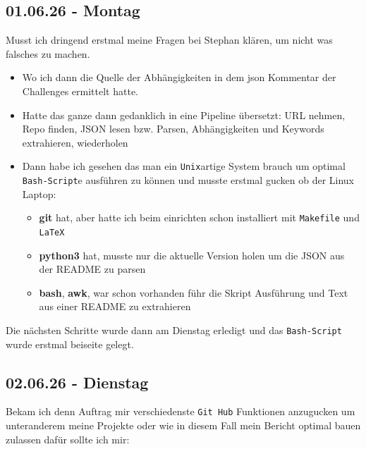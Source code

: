 {\small
\subsection{01.06.26 - Montag}

Musst ich dringend erstmal meine Fragen bei Stephan klären, um nicht was falsches zu machen.

\begin{itemize}
  \item Wo ich dann die Quelle der Abhängigkeiten in dem json Kommentar der Challenges ermittelt hatte.
  \item Hatte das ganze dann gedanklich in eine Pipeline übersetzt:
  URL nehmen, Repo finden, JSON lesen bzw. Parsen, Abhängigkeiten und Keywords extrahieren, wiederholen
  \item Dann habe ich gesehen das man ein \texttt{Unix}artige System brauch um optimal \texttt{Bash-Script}e ausführen zu können und musste erstmal gucken ob der Linux Laptop:
  \begin{itemize}
    \item \textbf{git} hat, aber hatte ich beim einrichten schon installiert mit \texttt{Makefile} und \texttt{LaTeX}
    \item \textbf{python3} hat, musste nur die aktuelle Version holen um die JSON aus der README zu parsen
    \item \textbf{bash}, \textbf{awk}, war schon vorhanden führ die Skript Ausführung und Text aus einer README zu extrahieren
  \end{itemize}
\end{itemize}

Die nächsten Schritte wurde dann am Dienstag erledigt und das \texttt{Bash-Script} wurde erstmal beiseite gelegt.

\subsection{02.06.26 - Dienstag}


Bekam ich denn Auftrag mir verschiedenste \texttt{Git Hub} Funktionen anzugucken um unteranderem meine Projekte oder wie in diesem Fall mein Bericht optimal bauen zulassen dafür sollte ich mir:

}
